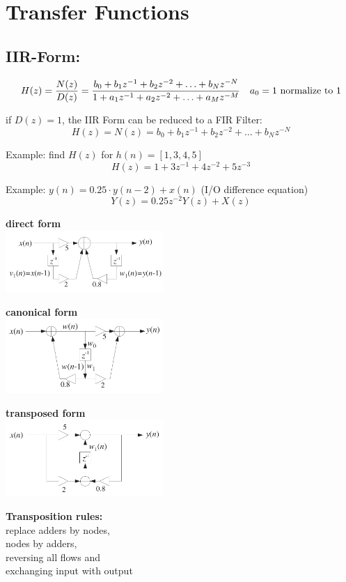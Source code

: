 \section{Transfer Functions}
\subsection{IIR-Form:}
\begin{align}
H(z) = \frac{N(z)}{D(z)}
		= \frac{b_0 + b_1 z^{-1} + b_2 z^{-2} + \ldots + b_N z^{-N}}{1 + a_1 z^{-1} + a_2 z^{-2} + \ldots + a_M z^{-M} } && a_0 = 1 \text{ normalize to } 1 \notag
\end{align}

if $D(z) = 1$, the IIR Form can be reduced to a FIR Filter:
\[
	H(z) = N(z) = b_0 + b_1 z^{-1} + b_2 z^{-2} + \ldots + b_N z^{-N}
\]

Example: find $H(z)$ for $h(n) = \left[1,3,4,5\right]$
\[ H(z) = 1 + 3z^{-1} + 4z^{-2} + 5z^{-3}\]

Example: $y(n) = 0.25 \cdot y(n-2) + x(n) $ \qquad (I/O difference equation)
\[
	Y(z) = 0.25z^{-2}Y(z) + X(z)
\]

\begin{multicols}{3}
  \textbf{direct form }\\
  \includegraphics[width=6cm]{./picture/direct_form}
  
  \columnbreak
  
  \textbf{canonical form }\\
  \includegraphics[width=6cm]{./picture/canonical_form}
  
  \columnbreak
  
  \textbf{transposed form }\\
  \includegraphics[width=6cm]{./picture/transposed_form}
  
  \textbf{Transposition rules:} \\
  replace adders by nodes, \\
  nodes by adders, \\
  reversing all flows and \\
  exchanging input with output
\end{multicols}

